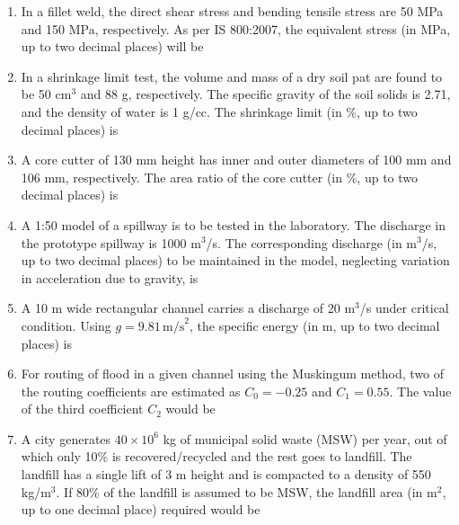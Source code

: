 \documentclass[journal,12pt,onecolumn]{IEEEtran}
\theoremstyle{remark}
\begin{document}
\begin{enumerate}
\item In a fillet weld, the direct shear stress and bending tensile stress are 50 MPa and 150 MPa, respectively. As per IS 800:2007, the equivalent stress (in MPa, up to two decimal places) will be \underline{\hspace{1cm}}

\item In a shrinkage limit test, the volume and mass of a dry soil pat are found to be 50 cm$^3$ and 88 g, respectively. The specific gravity of the soil solids is 2.71, and the density of water is 1 g/cc. The shrinkage limit (in \%, up to two decimal places) is \underline{\hspace{1cm}}

\item A core cutter of 130 mm height has inner and outer diameters of 100 mm and 106 mm, respectively. The area ratio of the core cutter (in \%, up to two decimal places) is \underline{\hspace{1cm}}

\item A 1:50 model of a spillway is to be tested in the laboratory. The discharge in the prototype spillway is 1000 m$^3$/s. The corresponding discharge (in m$^3$/s, up to two decimal places) to be maintained in the model, neglecting variation in acceleration due to gravity, is \underline{\hspace{1cm}}

\item A 10 m wide rectangular channel carries a discharge of 20 m$^3$/s under critical condition. Using $g = 9.81 \, \text{m/s}^2$, the specific energy (in m, up to two decimal places) is \underline{\hspace{1cm}}

\item For routing of flood in a given channel using the Muskingum method, two of the routing coefficients are estimated as $C_0 = -0.25$ and $C_1 = 0.55$. The value of the third coefficient $C_2$ would be \underline{\hspace{1cm}}

\item A city generates $40 \times 10^6$ kg of municipal solid waste (MSW) per year, out of which only 10\% is recovered/recycled and the rest goes to landfill. The landfill has a single lift of 3 m height and is compacted to a density of 550 kg/m$^3$. If 80\% of the landfill is assumed to be MSW, the landfill area (in m$^2$, up to one decimal place) required would be \underline{\hspace{1cm}}\\


\end{enumerate}
\end{document}
